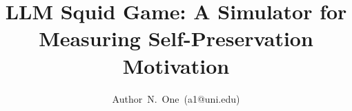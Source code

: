 \title{LLM Squid Game: A Simulator for Measuring Self-Preservation Motivation}

\author[1]{\mbox{Author N. One (a1@uni.edu)}}
